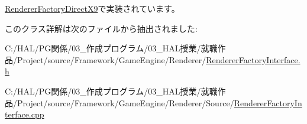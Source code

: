 \mbox{\hyperlink{class_renderer_factory_direct_x9_a55541ea707af7ba3c006b0ea11a1fd49}{Renderer\+Factory\+Direct\+X9}}で実装されています。



このクラス詳解は次のファイルから抽出されました\+:\begin{DoxyCompactItemize}
\item 
C\+:/\+H\+A\+L/\+P\+G関係/03\+\_\+作成プログラム/03\+\_\+\+H\+A\+L授業/就職作品/\+Project/source/\+Framework/\+Game\+Engine/\+Renderer/\mbox{\hyperlink{_renderer_factory_interface_8h}{Renderer\+Factory\+Interface.\+h}}\item 
C\+:/\+H\+A\+L/\+P\+G関係/03\+\_\+作成プログラム/03\+\_\+\+H\+A\+L授業/就職作品/\+Project/source/\+Framework/\+Game\+Engine/\+Renderer/\+Source/\mbox{\hyperlink{_renderer_factory_interface_8cpp}{Renderer\+Factory\+Interface.\+cpp}}\end{DoxyCompactItemize}
